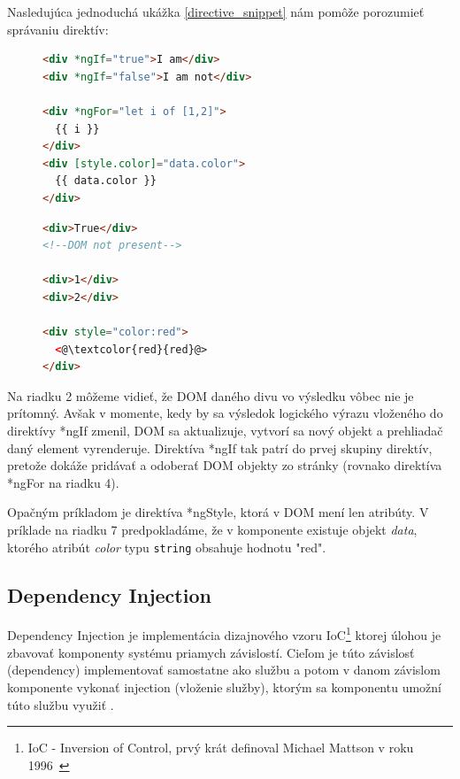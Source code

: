 \documentclass[
  digital, %
  twoside, %
  notable,   %
  nolof,   %
  nolot,   %
]{fithesis3}
\begin{document}
Nasledujúca jednoduchá ukážka \ref{directive_snippet} nám pomôže porozumieť správaniu direktív:
\begin{figure}
 \centering
 \begin{minipage}{.59\textwidth}

  \centering
  \begin{lstlisting}[language=HTML,caption={Direktívy použité v template (vľavo) a ako ich vo výsledku vníma prehliadač (vpravo)},label=directive_snippet]
<div *ngIf="true">I am</div>
<div *ngIf="false">I am not</div>

<div *ngFor="let i of [1,2]">
  {{ i }}
</div>
<div [style.color]="data.color">
  {{ data.color }}
</div>
  \end{lstlisting}

 \end{minipage}
 \begin{minipage}{.39\textwidth}

  \centering
  \begin{lstlisting}[language=HTML,numbers=none,xleftmargin=0em]
<div>True</div>
<!--DOM not present-->

<div>1</div>
<div>2</div>

<div style="color:red">
  <@\textcolor{red}{red}@>
</div>
  \end{lstlisting}
 
 \end{minipage}
\end{figure}

Na riadku 2 môžeme vidieť, že DOM daného divu vo výsledku vôbec nie je prítomný. Avšak v momente, kedy by sa výsledok logického výrazu vloženého do direktívy *ngIf zmenil, DOM sa aktualizuje, vytvorí sa nový objekt a prehliadač daný element vyrenderuje. Direktíva *ngIf tak patrí do prvej skupiny direktív, pretože dokáže pridávať a odoberať DOM objekty zo stránky (rovnako direktíva *ngFor na riadku 4).

Opačným príkladom je direktíva *ngStyle, ktorá v DOM mení len atribúty. V príklade na riadku 7 predpokladáme, že v komponente existuje objekt \textit{data}, ktorého atribút \textit{color} typu \texttt{string} obsahuje hodnotu "red".

\subsection{Dependency Injection}
\label{sec_di}
Dependency Injection je implementácia dizajnového vzoru IoC\footnote{IoC - Inversion of Control, prvý krát definoval Michael Mattson v roku 1996~\cite{mattsson1996object}} ktorej úlohou je zbavovať komponenty systému priamych závislostí. Cieľom je túto závislosť (dependency) implementovať samostatne ako službu a potom v danom závislom komponente vykonať injection (vloženie služby), ktorým sa komponentu umožní túto službu využiť \cite{chiba2005aspect, yang2008empirical}.
\end{document}
